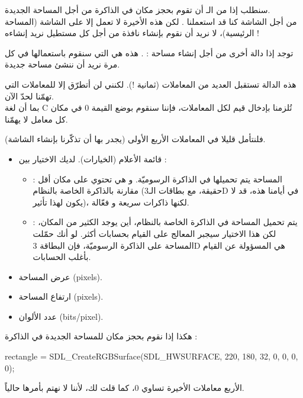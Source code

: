 سنطلب إذا من الـ
أن تقوم بحجز مكان في الذاكرة من أجل المساحة الجديدة.\\
من أجل الشاشة كنا قد استعملنا
.
لكن هذه الأخيرة لا تعمل إلا على  الشاشة (المساحة الرئيسية)، لا نريد أن نقوم بإنشاء نافذة من أجل كل مستطيل نريد إنشاءه !

توجد إذا دالة أخرى من أجل إنشاء مساحة : 
.
هذه هي التي سنقوم باستعمالها في كل مرة نريد أن ننشئ مساحة جديدة.

هذه الدالة تستقبل العديد من المعاملات (ثمانية !). لكنني لن أتطرّق إلا للمعاملات التي تهمّنا لحدّ الآن.\\
بما أن لغة 
\textenglish{C}
تُلزمنا بإدخال قيم لكل المعاملات، فإننا سنقوم بوضع القيمة 0 في مكان كل معامل لا يهمّنا.

فلنتأمل قليلا في المعاملات الأربع الأولى (يجدر بها أن تذكّرنا بإنشاء الشاشة).

\begin{itemize}
	\item قائمة الأعلام (الخيارات). لديك الاختيار بين :
	\begin{itemize}
		\item {} :
		المساحة يتم تحميلها في الذاكرة الرسوميّة. و هي تحتوي على مكان أقل مقارنة بالذاكرة الخاصة بالنظام (حقيقة، مع بطاقات الـ\textenglish{3D}
		في أيامنا هذه، قد لا يكون لهذا تأثير)، لكنها ذاكرات سريعة و فعّالة.
		\item {} :
		يتم تحميل المساحة في الذاكرة الخاصة بالنظام، أين يوجد الكثير من المكان، لكن هذا الاختيار سيجبر المعالج على القيام بحسابات أكثر. لو أنك حمّلت المساحة على الذاكرة الرسوميّة، فإن البطاقة 
		\textenglish{3D}
		هي المسؤولة عن القيام بأغلب الحسابات.
	\end{itemize}
	\item عرض المساحة (\textenglish{pixels}).
	\item ارتفاع المساحة (\textenglish{pixels}).
	\item عدد الألوان (\textenglish{bits/pixel}).
\end{itemize}

هكذا إذا نقوم بحجز مكان للمساحة الجديدة في الذاكرة :

\begin{Csource}
rectangle = SDL_CreateRGBSurface(SDL_HWSURFACE, 220, 180, 32, 0, 0, 0, 0);
\end{Csource}

الأربع معاملات الأخيرة تساوي 0، كما قلت لك، لأننا لا نهتم بأمرها حالياً. 


